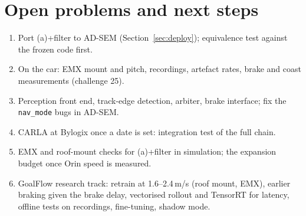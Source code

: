 \documentclass[11pt,a4paper]{article}
\newcommand{\code}[1]{\texttt{#1}}
\begin{document}
\section{Open problems and next steps}
\begin{enumerate}[nosep]
  \item Port (a)+filter to AD-SEM (Section~\ref{sec:deploy}); equivalence test against the frozen code first.
  \item On the car: EMX mount and pitch, recordings, artefact rates, brake and coast measurements (challenge 25).
  \item Perception front end, track-edge detection, arbiter, brake interface; fix the \code{nav\_mode} bugs in AD-SEM.
  \item CARLA at Bylogix once a date is set: integration test of the full chain.
  \item EMX and roof-mount checks for (a)+filter in simulation; the expansion budget once Orin speed is measured.
  \item GoalFlow research track: retrain at 1.6--2.4\,m/s (roof mount, EMX), earlier braking given the brake delay,
        vectorised rollout and TensorRT for latency, offline tests on recordings, fine-tuning, shadow mode.
\end{enumerate}

\appendix
\end{document}
